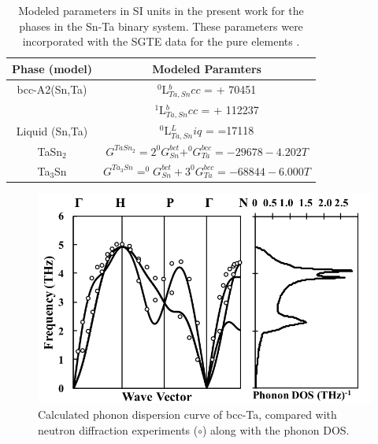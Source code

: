 \newpage
\begin{table}[H]
 	\caption{Modeled parameters in SI units in the present work for the phases in the Sn-Ta binary system. These parameters were incorporated with the SGTE data for the pure elements \cite{Dinsdale1991}.}
 	\centering
 	\begin{tabular}{ c c }
 		\hline
 		Phase (model) & Modeled Paramters\\
 		\hline
 		bcc-A2(Sn,Ta) & $^0$L$_{Ta,Sn}^bcc$ = + 70451\\
 		 & $^1$L$_{Ta,Sn}^bcc$ = + 112237\\
 		 Liquid (Sn,Ta) & $^0$L$_{Ta,Sn}^Liq$ = =17118\\
 		 TaSn$_2$ & $G^{TaSn_{2}} = 2^0G_{Sn}^{bct} + ^{0}G_{Ta}^{bcc} = -29678 - 4.202T$ \\
 		 Ta$_3$Sn & $G^{Ta_{3}Sn} = ^0G_{Sn}^{bct} + 3^{0}G_{Ta}^{bcc} = -68844 - 6.000T$ \\
 		\hline
 	\end{tabular}
 	\label{Ch4-table:ip}
 \end{table}
 \clearpage

\pagebreak
\begin{figure}[H]
	\centering
	\includegraphics[width=\textwidth]{Chapter-4/Figures/Taphonondos.png}
	\caption{Calculated phonon dispersion curve of bcc-Ta, compared with neutron diffraction experiments ($\circ$) \cite{Taioli2007a} along with the phonon DOS. }
	\label{Ch4-figure:Taphonon}
\end{figure}


